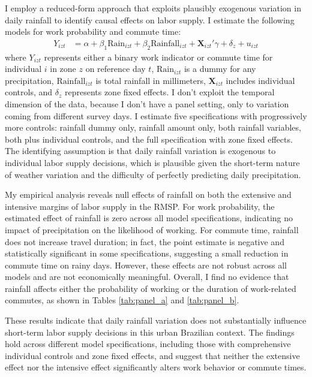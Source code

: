 I employ a reduced-form approach that exploits plausibly exogenous variation in daily rainfall to identify causal effects on labor supply. I estimate the following models for work probability and commute time:
\begin{align*}
Y_{izt} &= \alpha + \beta_1 \text{Rain}_{izt} + \beta_2 \text{Rainfall}_{izt} + \mathbf{X}_{izt}'\gamma + \delta_z + u_{izt}
\end{align*}
where $Y_{izt}$ represents either a binary work indicator or commute time for individual $i$ in zone $z$ on reference day $t$, $\text{Rain}_{izt}$ is a dummy for any precipitation, $\text{Rainfall}_{izt}$ is total rainfall in millimeters, $\mathbf{X}_{izt}$ includes individual controls, and $\delta_z$ represents zone fixed effects. I don't exploit the temporal dimension of the data, because I don't have a panel setting, only to variation coming from different survey days. I estimate five specifications with progressively more controls: rainfall dummy only, rainfall amount only, both rainfall variables, both plus individual controls, and the full specification with zone fixed effects. The identifying assumption is that daily rainfall variation is exogenous to individual labor supply decisions, which is plausible given the short-term nature of weather variation and the difficulty of perfectly predicting daily precipitation.

My empirical analysis reveals null effects of rainfall on both the extensive and intensive margins of labor supply in the RMSP. For work probability, the estimated effect of rainfall is zero across all model specifications, indicating no impact of precipitation on the likelihood of working. For commute time, rainfall does not increase travel duration; in fact, the point estimate is negative and statistically significant in some specifications, suggesting a small reduction in commute time on rainy days. However, these effects are not robust across all models and are not economically meaningful. Overall, I find no evidence that rainfall affects either the probability of working or the duration of work-related commutes, as shown in Tables \ref{tab:panel_a} and \ref{tab:panel_b}.




These results indicate that daily rainfall variation does not substantially influence short-term labor supply decisions in this urban Brazilian context. The findings hold across different model specifications, including those with comprehensive individual controls and zone fixed effects, and suggest that neither the extensive effect nor the intensive effect significantly alters work behavior or commute times.  

